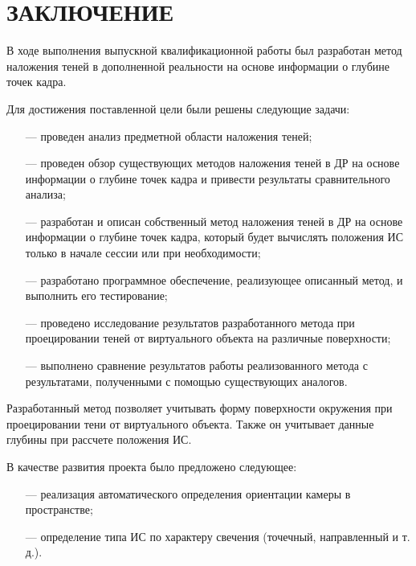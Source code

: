 \chapter*{ЗАКЛЮЧЕНИЕ}

В ходе выполнения выпускной квалификационной работы был разработан метод наложения теней в дополненной реальности на основе информации о глубине точек кадра.

Для достижения поставлен­ной цели были решены следующие задачи:

\begin{itemize}
	\item[---] проведен анализ предметной области наложения теней;
	\item[---] проведен обзор существующих методов наложения теней в ДР на основе информации о глубине точек кадра и привести результаты сравнительного анализа;
	\item[---] разработан и описан собственный метод наложения теней в ДР на основе информации о глубине точек кадра, который будет вычислять положения ИС только в начале сессии или при необходимости;
	\item[---] разработано программное обеспечение, реализующее описанный метод, и выполнить его тестирование;
	\item[---] проведено исследование результатов разработанного метода при проецировании теней от виртуального объекта на различные поверхности;
	\item[---] выполнено сравнение результатов работы реализованного метода с результатами, полученными с помощью существующих аналогов.
\end{itemize}

Разработанный метод позволяет учитывать форму поверхности окружения при проецировании тени от виртуального объекта. Также он учитывает данные глубины при рассчете положения ИС.

В качестве развития проекта было предложено следующее:

\begin{itemize}
	\item[---] реализация автоматического определения ориентации камеры в пространстве;
	\item[---] определение типа ИС по характеру свечения (точечный, направленный и т. д.).
\end{itemize}
